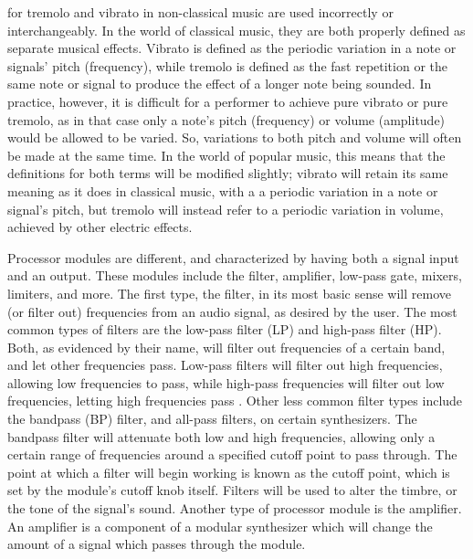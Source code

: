 for tremolo and vibrato in non-classical music are used incorrectly or interchangeably. In the world of classical music, they are both properly defined as separate musical effects. Vibrato is defined as the periodic variation in a note or signals' pitch (frequency), while tremolo is defined as the fast repetition or the same note or signal to produce the effect of a longer note being sounded. In practice, however, it is difficult for a performer to achieve pure vibrato or pure tremolo, as in that case only a note's pitch (frequency) or volume (amplitude) would be allowed to be varied. So, variations to both pitch and volume will often be made at the same time. In the world of popular music, this means that the definitions for both terms will be modified slightly; vibrato will retain its same meaning as it does in classical music, with a a periodic variation in a note or signal's pitch, but tremolo will instead refer to a periodic variation in volume, achieved by other electric effects.

Processor modules are different, and characterized by having both a signal input and an output. These modules include the filter, amplifier, low-pass gate, mixers, limiters, and more. The first type, the filter, in its most basic sense will remove (or filter out) frequencies from an audio signal, as desired by the user. The most common types of filters are the low-pass filter (LP) and high-pass filter (HP). Both, as evidenced by their name, will filter out frequencies of a certain band, and let other frequencies pass. Low-pass filters will filter out high frequencies, allowing low frequencies to pass, while high-pass frequencies will filter out low frequencies, letting high frequencies pass \cite{Winer_2018}. Other less common filter types include the bandpass (BP) filter, and all-pass filters, on certain synthesizers. The bandpass filter will attenuate both low and high frequencies, allowing only a certain range of frequencies around a specified cutoff point to pass through. The point at which a filter will begin working is known as the cutoff point, which is set by the module's cutoff knob itself. Filters will be used to alter the timbre, or the tone of the signal's sound. Another type of processor module is the amplifier. An amplifier is a component of a modular synthesizer which will change the amount of a signal which passes through the module. 

